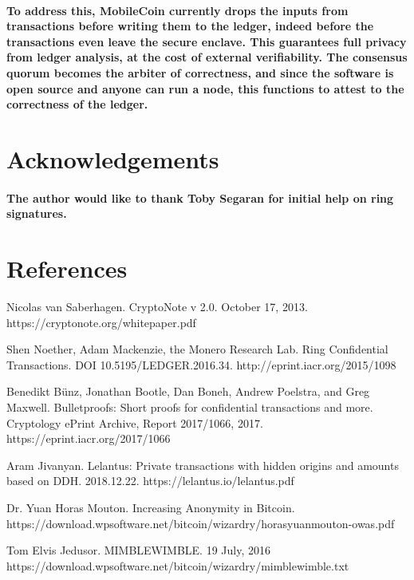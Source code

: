 \documentclass{article}
\begin{document}
\paragraph{To address this, MobileCoin currently drops the inputs from transactions before writing them to the ledger, indeed before the transactions even leave the secure enclave.  This guarantees full privacy from ledger analysis, at the cost of external verifiability.  The consensus quorum becomes the arbiter of correctness, and since the software is open source and anyone can run a node, this functions to attest to the correctness of the ledger.}



\section{Acknowledgements}

\paragraph{The author would like to thank Toby Segaran for initial help on ring signatures.}



\section{References}

Nicolas van Saberhagen. CryptoNote v 2.0. October 17, 2013. https://cryptonote.org/whitepaper.pdf

Shen Noether, Adam Mackenzie, the Monero Research Lab. Ring Confidential Transactions. DOI 10.5195/LEDGER.2016.34. http://eprint.iacr.org/2015/1098

Benedikt Bünz, Jonathan Bootle, Dan Boneh, Andrew Poelstra, and Greg Maxwell. Bulletproofs: Short proofs for confidential transactions and more. Cryptology ePrint Archive, Report 2017/1066, 2017. https://eprint.iacr.org/2017/1066

Aram Jivanyan. Lelantus: Private transactions with hidden origins and amounts based on DDH. 2018.12.22. https://lelantus.io/lelantus.pdf

Dr. Yuan Horas Mouton. Increasing Anonymity in Bitcoin. https://download.wpsoftware.net/bitcoin/wizardry/horasyuanmouton-owas.pdf

Tom Elvis Jedusor. MIMBLEWIMBLE. 19 July, 2016 https://download.wpsoftware.net/bitcoin/wizardry/mimblewimble.txt
\end{document}
